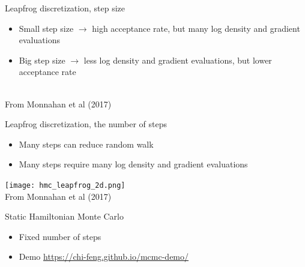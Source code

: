 \documentclass[finnish,english,t]{beamer}
\begin{document}
\begin{frame}{Leapfrog discretization, step size}

  \vspace{-0.5\baselineskip}
  \begin{itemize}
    \item Small step size $\rightarrow$ high acceptance rate, but many
      log density and gradient evaluations
    \item Big step size $\rightarrow$ less log density and gradient
      evaluations, but lower acceptance rate 
    \end{itemize}
  \\
  {\footnotesize From Monnahan et al (2017)}
\end{frame}

\begin{frame}{Leapfrog discretization, the number of steps}

    \begin{itemize}
    \item Many steps can reduce random walk
    \item Many steps require many log density and gradient evaluations
    \end{itemize}
    \vspace{20.5pt}
    {\texttt{[image: hmc\_leapfrog\_2d.png]}}\\
  {\footnotesize From Monnahan et al (2017)}
\end{frame}
  
\begin{frame}{Static Hamiltonian Monte Carlo}

  \begin{itemize}
  \item Fixed number of steps
  \item Demo \url{https://chi-feng.github.io/mcmc-demo/}
  \end{itemize}

\end{frame}
\end{document}

